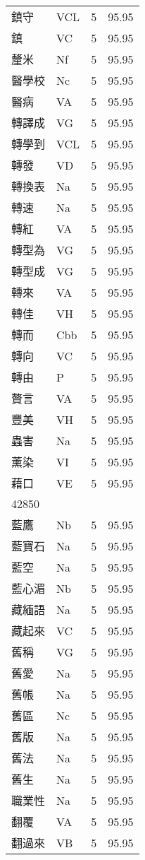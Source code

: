 \documentclass[twocolumn]{book}
\begin{document}
\begin{supertabular}{llrr}
鎮守 & VCL & 5 &  95.95\\
鎮 & VC & 5 &  95.95\\
釐米 & Nf & 5 &  95.95\\
醫學校 & Nc & 5 &  95.95\\
醫病 & VA & 5 &  95.95\\
轉譯成 & VG & 5 &  95.95\\
轉學到 & VCL & 5 &  95.95\\
轉發 & VD & 5 &  95.95\\
轉換表 & Na & 5 &  95.95\\
轉速 & Na & 5 &  95.95\\
轉紅 & VA & 5 &  95.95\\
轉型為 & VG & 5 &  95.95\\
轉型成 & VG & 5 &  95.95\\
轉來 & VA & 5 &  95.95\\
轉佳 & VH & 5 &  95.95\\
轉而 & Cbb & 5 &  95.95\\
轉向 & VC & 5 &  95.95\\
轉由 & P & 5 &  95.95\\
贅言 & VA & 5 &  95.95\\
豐美 & VH & 5 &  95.95\\
蟲害 & Na & 5 &  95.95\\
薰染 & VI & 5 &  95.95\\
藉口 & VE & 5 &  95.95\\
42850\\
藍鷹 & Nb & 5 &  95.95\\
藍寶石 & Na & 5 &  95.95\\
藍空 & Na & 5 &  95.95\\
藍心湄 & Nb & 5 &  95.95\\
藏緬語 & Na & 5 &  95.95\\
藏起來 & VC & 5 &  95.95\\
舊稱 & VG & 5 &  95.95\\
舊愛 & Na & 5 &  95.95\\
舊帳 & Na & 5 &  95.95\\
舊區 & Nc & 5 &  95.95\\
舊版 & Na & 5 &  95.95\\
舊法 & Na & 5 &  95.95\\
舊生 & Na & 5 &  95.95\\
職業性 & Na & 5 &  95.95\\
翻覆 & VA & 5 &  95.95\\
翻過來 & VB & 5 &  95.95\\

\end{supertabular}
\end{document}

